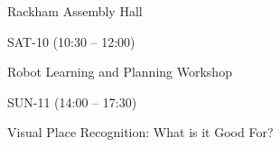 \documentclass{article}
\begin{document}
\rssheader[2in]

\rssbig
\begin{center}
Rackham Assembly Hall
\end{center}

\vfill

\rssmed
\begin{center}
SAT-10 (10:30 -- 12:00)
\end{center}

\rsssm
\begin{center}
Robot Learning and Planning Workshop
\end{center}

\vfill

\rssmed
\begin{center}
SUN-11 (14:00 -- 17:30)
\end{center}

\rsssm
\begin{center}
Visual Place Recognition: What is it Good For?
\end{center}

\vfill
\end{document}
